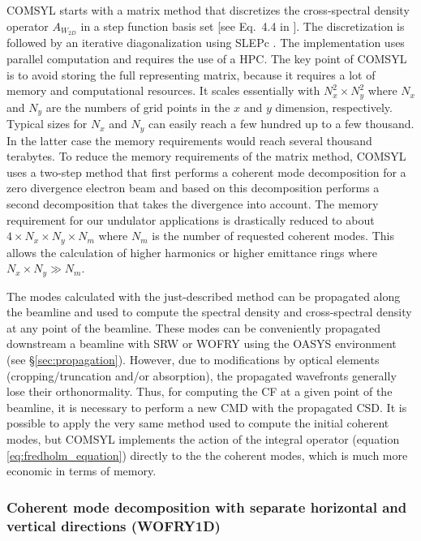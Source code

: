 \documentclass{iucr}              %
\begin{document}
COMSYL starts with a matrix method that discretizes the cross-spectral density operator $A_{W_{2D}}$ in a step function basis set [see Eq.~4.4 in \cite{glassThesis}]. The discretization is followed by an iterative diagonalization using SLEPc \cite{SLEPc}. The implementation uses parallel computation and requires the use of a HPC. The key point of COMSYL is to avoid storing the full representing matrix, because it requires a lot of memory and computational resources. It scales essentially with $N_x^2 \times N_y^2$ where $N_x$ and $N_y$ are the numbers of grid points in the $x$ and $y$ dimension, respectively. Typical sizes for $N_x$ and $N_y$ can easily reach a few hundred up to a few thousand. In the latter case the memory requirements would reach several thousand terabytes. To reduce the memory requirements of the matrix method, COMSYL uses a two-step method that first performs a coherent mode decomposition for a zero divergence electron beam and based on this decomposition performs a second decomposition that takes the divergence into account. The memory requirement for our undulator applications is drastically reduced to about $4 \times N_x \times N_y \times N_m$ where $N_m$ is the number of requested coherent modes. This allows the calculation of higher harmonics or higher emittance rings where $N_x \times N_y \gg N_m$. 

The modes calculated with the just-described method can be propagated along the beamline and used to compute the spectral density and cross-spectral density at any point of the beamline. These modes can be conveniently propagated downstream a beamline with SRW or WOFRY using the OASYS environment (see \S\ref{sec:propagation}). However, due to modifications by optical elements (cropping/truncation and/or absorption), the propagated wavefronts generally lose their orthonormality. Thus, for computing the CF at a given point of the beamline, it is necessary to perform a new CMD with the propagated CSD. It is possible to apply the very same method used to compute the initial coherent modes, but COMSYL implements the action of the integral operator (equation \ref{eq:fredholm_equation}) directly to the the coherent modes, which is much more economic in terms of memory.


\subsubsection{Coherent mode decomposition with separate horizontal and vertical directions (WOFRY1D)\\}\label{sec:WOFRY1D}
\end{document}
